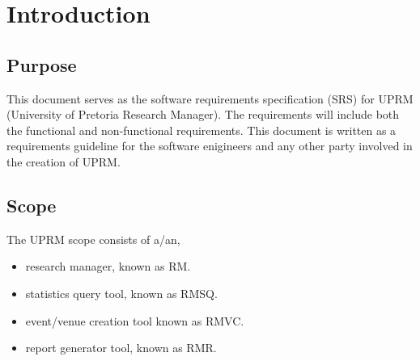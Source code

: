 \section{Introduction}

	\subsection{Purpose}
		This document serves as the software requirements specification (SRS) for UPRM (University of Pretoria Research Manager). 
		The requirements will include both the functional and non-functional requirements. 
		This document is written as a requirements guideline for the software enigineers and any other party involved in the creation of UPRM.

	\subsection{Scope}
		\begin{paragraph}{}
			The UPRM scope consists of a/an,
			\begin{itemize}
				\item research manager, known as RM.
				\item statistics query tool, known as RMSQ.
				\item event/venue creation tool known as RMVC.
				\item report generator tool, known as RMR.\\
			\end{itemize}
		\end{paragraph}

